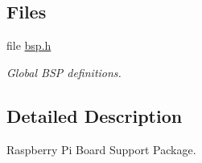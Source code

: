 \subsection*{Files}
\begin{DoxyCompactItemize}
\item 
file \mbox{\hyperlink{bsps_2arm_2raspberrypi_2include_2bsp_8h}{bsp.\+h}}
\begin{DoxyCompactList}\small\item\em Global B\+SP definitions. \end{DoxyCompactList}\end{DoxyCompactItemize}


\subsection{Detailed Description}
Raspberry Pi Board Support Package. 

